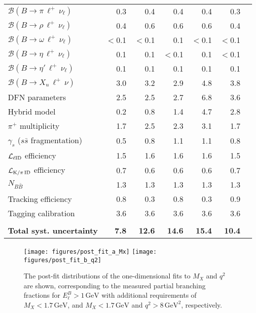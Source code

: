 \documentclass[twocolumn,aps,prd,superscriptaddress,nofootinbib,floatfix,preprintnumbers,a4]{revtex4-1}
\newcommand{\bpilnu}{\ensuremath{B \to \pi \, \ell^+\,\nu_{\ell}}\xspace}
\newcommand{\brholnu}{\ensuremath{B \to \rho \, \ell^+\,\nu_{\ell}}\xspace}
\newcommand{\bomegalnu}{\ensuremath{B \to \omega \, \ell^+\,\nu_{\ell}}\xspace}
\newcommand{\betalnu}{\ensuremath{B \to \eta \, \ell^+\,\nu_{\ell}}\xspace}
\newcommand{\betaplnu}{\ensuremath{B \to \eta' \, \ell^+\,\nu_{\ell}}\xspace}
\begin{document}
\begin{table}[t!]
\begin{tabular}{lrrrrrr}
 \qquad $\mathcal{B}(\bpilnu)$ & 0.3 & 0.4 & 0.4 & 0.4 & 0.3\\
 \qquad $\mathcal{B}(\brholnu)$ & 0.4 & 0.6 & 0.6 & 0.6 & 0.4\\
 \qquad $\mathcal{B}(\bomegalnu)$ & $<$0.1 & $<$0.1 & 0.1 & $<$0.1 & $<$0.1\\
 \qquad $\mathcal{B}(\betalnu)$ & 0.1 & 0.1 & $<$0.1 & 0.1 & $<$0.1\\
 \qquad $\mathcal{B}(\betaplnu)$ & 0.1 & 0.1 & 0.1 & 0.1 & 0.1\\
 \qquad $\mathcal{B}(B \to X_u \, \ell^+ \, \nu)$  & 3.0& 3.2 & 2.9 & 4.8 & 3.8 \\
 \qquad DFN parameters & 2.5& 2.5 & 2.7 & 6.8& 3.6 \\
 \qquad Hybrid model & 0.2 & 0.8 & 1.4 & 4.7 & 2.8 \\
 \qquad $\pi^+$ multiplicity  & 1.7 & 2.5 & 2.3 & 3.1 & 1.7 \\
 \qquad $\gamma_s$ ($s \bar s$ fragmentation) & 0.5 & 0.8 & 1.1 & 1.1 & 0.8 \\
 \quad $\mathcal{L}_{\rm \ell ID}$ efficiency & 1.5 & 1.6 & 1.6& 1.6 & 1.5 \\
 \quad $\mathcal{L}_{\rm K/\pi \, ID}$ efficiency & 0.7 & 0.6 & 0.6 & 0.6 & 0.7 \\
 \quad $N_{B \bar B}$ & 1.3 & 1.3 & 1.3 & 1.3 & 1.3 \\
 \quad Tracking efficiency  & 0.8 & 0.3 & 0.8 & 0.3 & 0.9 \\
 \quad Tagging calibration & 3.6 & 3.6 & 3.6 & 3.6 & 3.6 \\ \\ \hline 
{\bf Total syst. uncertainty} & {\bf 7.8} & {\bf 12.6}   & {\bf 14.6}   & {\bf 15.4}  & {\bf 10.4} \vspace{1ex} \\
\hline\hline
\end{tabular}
\end{table}
\clearpage

\twocolumngrid

\begin{figure}[th!]
  \texttt{[image: figures/post\_fit\_a\_Mx]} 
  \texttt{[image: figures/post\_fit\_b\_q2]} 
\caption{
  The post-fit distributions of the one-dimensional fits to $M_X$ and $q^2$ are shown, corresponding to the measured partial branching fractions for $E_\ell^B > 1 \, \text{GeV}$  with additional requirements of $M_X < 1.7 \, \text{GeV}$, and $M_X < 1.7 \, \text{GeV}$ and $q^2 > 8 \, \text{GeV}^2$, respectively.
 }
\label{fig:post_fit_1D_1}
\end{figure}
\end{document}
